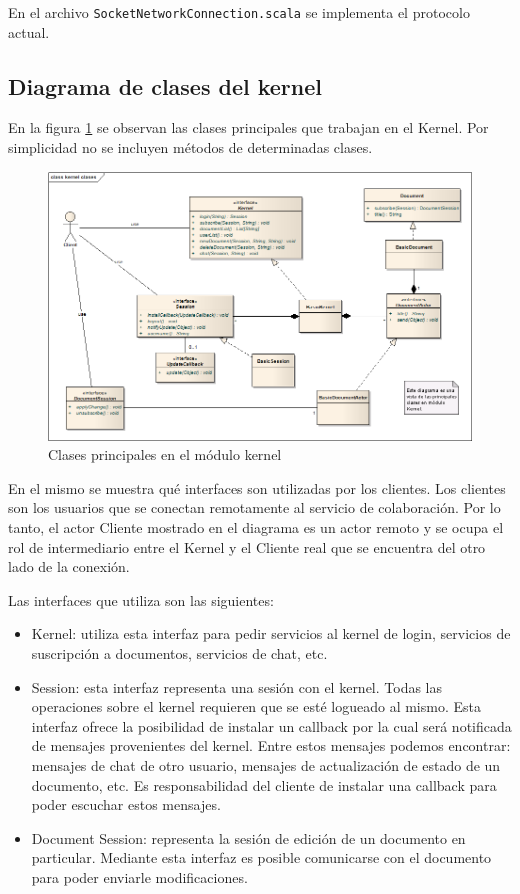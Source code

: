 \documentclass[12pt,a4paper]{article}
\begin{document}
En el archivo \texttt{SocketNetworkConnection.scala} se implementa el protocolo actual.

\subsection{Diagrama de clases del kernel}
En la figura \ref{clases-kernel} se observan las clases principales que trabajan en el Kernel. Por simplicidad no se 
incluyen métodos de determinadas clases.

	\begin{figure}[!ht]
		\begin{center}
			\includegraphics[width=14cm]{kernel-clases.png}
			\caption{\label{clases-kernel} Clases principales en el módulo kernel }
		\end{center}
	\end{figure}

En el mismo se muestra qué interfaces son utilizadas por los clientes. Los clientes son los usuarios que se conectan
remotamente al servicio de colaboración. Por lo tanto, el actor Cliente mostrado en el diagrama es un actor remoto y se
ocupa el rol de intermediario entre el Kernel y el Cliente real que se encuentra del otro lado de la conexión.

Las interfaces que utiliza son las siguientes:
\begin{itemize}
	\item Kernel: utiliza esta interfaz para pedir servicios al kernel de login, servicios de suscripción a documentos,
	servicios de chat, etc.

	\item Session: esta interfaz representa una sesión con el kernel. Todas las operaciones sobre el kernel requieren que se
	esté logueado al mismo. Esta interfaz ofrece la posibilidad de instalar un callback por la cual será notificada de mensajes
	provenientes del kernel. Entre estos mensajes podemos encontrar: mensajes de chat de otro usuario, mensajes de actualización
	de estado de un documento, etc. Es responsabilidad del cliente de instalar una callback para poder escuchar estos mensajes.

	\item Document Session: representa la sesión de edición de un documento en particular. Mediante esta interfaz es posible
	comunicarse con el documento para poder enviarle modificaciones.
\end{itemize}
\end{document}
